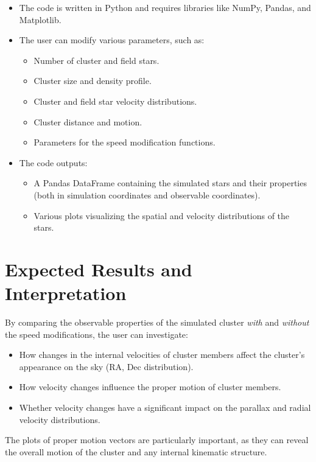 \documentclass{article}
\begin{document}
	\begin{itemize}
		\item The code is written in Python and requires libraries like NumPy, Pandas, and Matplotlib. 
		\item The user can modify various parameters, such as:
		\begin{itemize}
			\item Number of cluster and field stars. 
			\item Cluster size and density profile. 
			\item Cluster and field star velocity distributions. 
			\item Cluster distance and motion. 
			\item Parameters for the speed modification functions. 
		\end{itemize}
		\item The code outputs:
		\begin{itemize}
			\item A Pandas DataFrame containing the simulated stars and their properties (both in simulation coordinates and observable coordinates). 
			\item Various plots visualizing the spatial and velocity distributions of the stars. 
		\end{itemize}
	\end{itemize}
	
	\section{Expected Results and Interpretation}
	
	By comparing the observable properties of the simulated cluster \textit{with} and \textit{without} the speed modifications, the user can investigate:
	
	\begin{itemize}
		\item How changes in the internal velocities of cluster members affect the cluster's appearance on the sky (RA, Dec distribution). 
		\item How velocity changes influence the proper motion of cluster members. 
		\item Whether velocity changes have a significant impact on the parallax and radial velocity distributions. 
	\end{itemize}
	
	The plots of proper motion vectors are particularly important, as they can reveal the overall motion of the cluster and any internal kinematic structure. 
	
\end{document}

